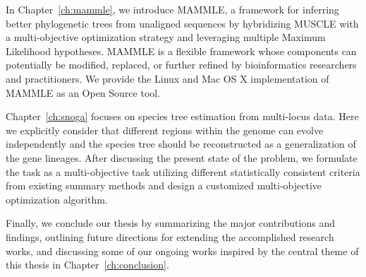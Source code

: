 
In Chapter~\ref{ch:mammle}, we introduce MAMMLE, a framework for inferring better phylogenetic trees from unaligned sequences by hybridizing MUSCLE with a multi-objective optimization strategy and leveraging multiple Maximum Likelihood hypotheses. MAMMLE is a flexible framework whose components can potentially be modified, replaced, or further refined by bioinformatics researchers and practitioners. We provide the Linux and Mac OS X implementation of MAMMLE as an Open Source tool.


Chapter~\ref{ch:snoga} focuses on species tree estimation from multi-locus data. Here we explicitly consider that different regions within the genome can evolve independently and the species tree should be reconstructed as a generalization of the gene lineages. After discussing the present state of the problem, we formulate the task as a multi-objective task utilizing different statistically consistent criteria from existing summary methods and design a customized multi-objective optimization algorithm.


Finally, we conclude our thesis by summarizing the major contributions and findings, outlining future directions for extending the accomplished research works, and discussing some of our ongoing works inspired by the central theme of this thesis in Chapter~\ref{ch:conclusion}.

